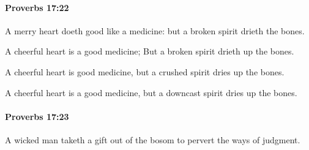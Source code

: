 		\paragraph{Proverbs 17:22} %
			\label{PROVERBS-17-22}

			A merry heart doeth good like a medicine: but a broken spirit drieth the bones.

			\begin{versebox}
					\item[BHS] 
					\item[ASV] A cheerful heart is a good medicine; But a broken spirit drieth up the bones.
					\item[NIV] A cheerful heart is good medicine, but a crushed spirit dries up the bones.
					\item[NRSV] A cheerful heart is a good medicine, but a downcast spirit dries up the bones.
			\end{versebox}

		\paragraph{Proverbs 17:23} %
			\label{PROVERBS-17-23}

			A wicked man taketh a gift out of the bosom to pervert the ways of judgment.

